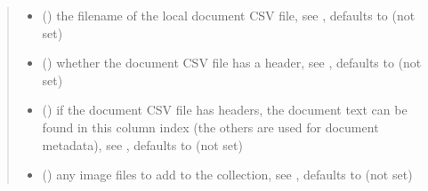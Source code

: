 \documentclass[letterpaper,10pt,english]{sphinxmanual}
\begin{document}
\begin{fulllineitems}
\begin{quote}
\begin{description}
\begin{itemize}
\item {} 
 (\sphinxstyleliteralemphasis{\sphinxupquote{, }}) \textendash{} the filename of the local document CSV file,
see , defaults to  (not set)

\item {} 
 (\sphinxstyleliteralemphasis{\sphinxupquote{, }}) \textendash{} whether the document CSV file has a header,
see , defaults to  (not set)

\item {} 
 (\sphinxstyleliteralemphasis{\sphinxupquote{, }}) \textendash{} if the document CSV file has headers, the document text
can be found in this column index (the others are used for
document metadata), see ,
defaults to  (not set)

\item {} 
 (\sphinxstyleliteralemphasis{\sphinxupquote{(}}\sphinxstyleliteralemphasis{\sphinxupquote{)}}) \textendash{} any image files to add to the collection, see {\hyperref[\detokenize{autoapi/pine/client/index:pine.client.CollectionBuilder.image_file}]{}},
defaults to  (not set)

\end{itemize}

\end{description}\end{quote}


\end{fulllineitems}
\end{document}
